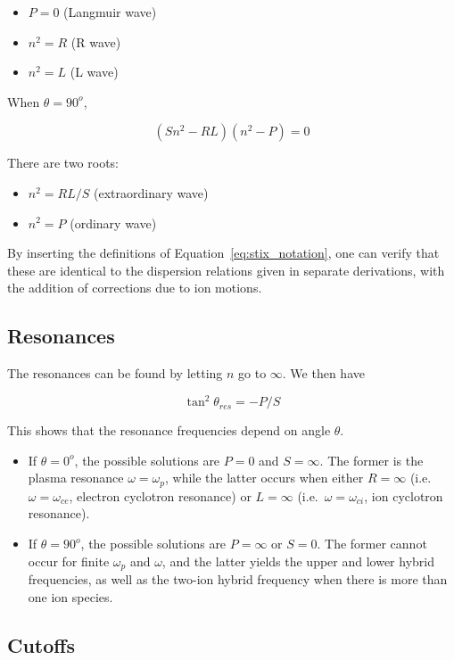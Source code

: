 \documentclass[
  notoc %
]{tufte-book}
\providecommand{\tightlist}{%
  \setlength{\itemsep}{0pt}\setlength{\parskip}{0pt}
}
\begin{document}
\begin{itemize}
\tightlist
\item
  \(P=0\) (Langmuir wave)
\item
  \(n^2=R\) (R wave)
\item
  \(n^2=L\) (L wave)
\end{itemize}

When \(\theta = 90^o\),

\[
(Sn^2-RL)(n^2-P) = 0
\]

There are two roots:

\begin{itemize}
\tightlist
\item
  \(n^2=RL/S\) (extraordinary wave)
\item
  \(n^2=P\) (ordinary wave)
\end{itemize}

By inserting the definitions of Equation~\ref{eq:stix_notation}, one can
verify that these are identical to the dispersion relations given in
separate derivations, with the addition of corrections due to ion
motions.

\hypertarget{resonances}{%
\subsection{Resonances}\label{resonances}}

The resonances can be found by letting \(n\) go to \(\infty\). We then
have

\[
\tan^2\theta_{res} = -P/S
\]

This shows that the resonance frequencies depend on angle \(\theta\).

\begin{itemize}
\tightlist
\item
  If \(\theta=0^o\), the possible solutions are \(P = 0\) and
  \(S = \infty\). The former is the plasma resonance
  \(\omega=\omega_p\), while the latter occurs when either
  \(R = \infty\) (i.e.~\(\omega=\omega_{ce}\), electron cyclotron
  resonance) or \(L =\infty\) (i.e.~\(\omega=\omega_{ci}\), ion
  cyclotron resonance).
\item
  If \(θ = 90^o\), the possible solutions are \(P =\infty\) or
  \(S = 0\). The former cannot occur for finite \(\omega_p\) and
  \(\omega\), and the latter yields the upper and lower hybrid
  frequencies, as well as the two-ion hybrid frequency when there is
  more than one ion species.
\end{itemize}

\hypertarget{cutoffs}{%
\subsection{Cutoffs}\label{cutoffs}}
\end{document}
